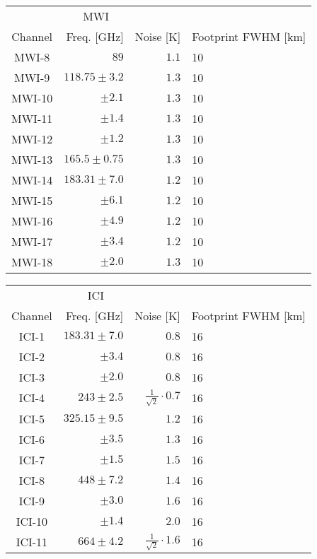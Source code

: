\documentclass[11pt]{scrartcl}
\begin{document}
\label{tab:channels}
    \begin{tabular}{c|r|r|p{2cm}}
    \multicolumn{3}{c}{MWI}\\
    Channel & Freq. [GHz] & Noise [K] & Footprint FWHM [km]\\
    \hline
    MWI-8  & $89$              & $1.1$ & 10\\
    MWI-9  & $118.75 \pm 3.2$  & $1.3$ & 10\\
    MWI-10 & $\pm 2.1$         & $1.3$ & 10\\
    MWI-11 & $\pm 1.4$         & $1.3$ & 10\\
    MWI-12 & $\pm 1.2$         & $1.3$ & 10\\
    MWI-13 & $165.5 \pm 0.75$  & $1.3$ & 10\\
    MWI-14 & $183.31 \pm 7.0$  & $1.2$ & 10\\
    MWI-15 & $ \pm 6.1$        & $1.2$ & 10\\
    MWI-16 & $ \pm 4.9$        & $1.2$ & 10\\
    MWI-17 & $ \pm 3.4$        & $1.2$ & 10\\
    MWI-18 & $ \pm 2.0$        & $1.3$ & 10\\
    \end{tabular}%
    \hspace{1cm}%
    \begin{tabular}{c|r|r|p{2cm}}
    \multicolumn{3}{c}{ICI}\\
    Channel & Freq. [GHz] & Noise [K]  & Footprint FWHM [km]\\
    \hline
    ICI-1  & $183.31 \pm 7.0$ & $0.8$ & 16\\
    ICI-2  & $       \pm 3.4$ & $0.8$ & 16\\
    ICI-3  & $       \pm 2.0$ & $0.8$ & 16\\
    ICI-4  & $243    \pm 2.5$ & $\frac{1}{\sqrt{2}} \cdot 0.7$ & 16\\
    ICI-5  & $325.15 \pm 9.5$ & $1.2$ & 16\\
    ICI-6  & $       \pm 3.5$ & $1.3$ & 16\\
    ICI-7  & $       \pm 1.5$ & $1.5$ & 16\\
    ICI-8  & $448    \pm 7.2$ & $1.4$ & 16\\
    ICI-9  & $       \pm 3.0$ & $1.6$ & 16\\
    ICI-10 & $       \pm 1.4$ & $2.0$ & 16\\
    ICI-11 & $664    \pm 4.2$ & $\frac{1}{\sqrt{2}} \cdot 1.6$ & 16\\
    \end{tabular}
\end{document}
